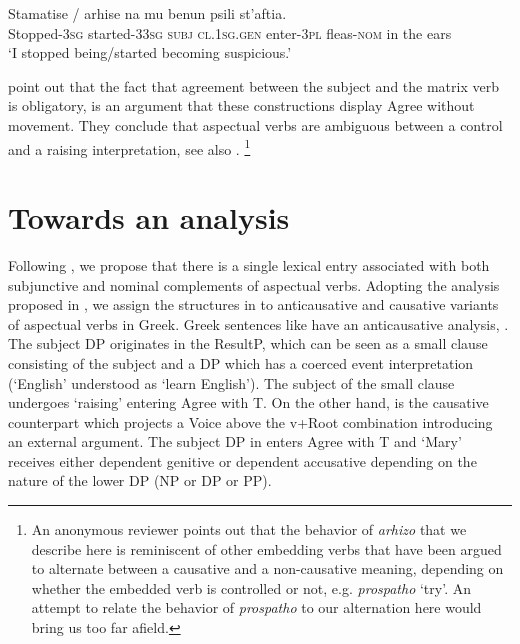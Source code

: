 \documentclass[output=paper]{langscibook}
\begin{document}
\ea%
    \label{alexiadouex:key:16}
    \gll *Stamatise / arhise    na     mu     benun psili    st'aftia.\\
    Stopped-\textsc{3sg} {} started-3\textsc{3sg}  \textsc{subj}    \textsc{cl.1sg.gen}   enter-\textsc{3pl} fleas-\textsc{nom}  {in the ears}   \\
    \glt ‘I stopped being/started becoming suspicious.’
\z

\citet{alexiadouanagnostopoulou1999} point out that the fact that agreement between the subject and the matrix verb is obligatory, 
is an argument that these constructions display Agree without movement. 
They conclude that aspectual verbs are ambiguous between a control and a raising interpretation, see also \citet{Roussou2009}.%
\footnote{
    An anonymous reviewer points out that the behavior of \textit{arhizo} that we describe here 
    is reminiscent of other embedding verbs that have been argued to alternate between a causative and a non-causative meaning, 
    depending on whether the embedded verb is controlled or not, e.g. \textit{prospatho} ‘try’. 
    An attempt to relate the behavior of \textit{prospatho} to our alternation here would bring us too far afield.
}

\section{Towards an analysis}

Following \citet{MourounasWilliamson2019}, we propose that there is a single lexical entry associated with both subjunctive and nominal complements of aspectual verbs. 
Adopting the analysis proposed in \citet{AlexiadouAnagnostopoulouSchafer2015}, 
we assign the structures in  to anticausative and causative variants of aspectual verbs in Greek. 
Greek sentences like  have an anticausative analysis, . 
The subject DP originates in the ResultP, which can be seen as a small clause consisting of the subject and a DP which has a coerced event interpretation 
(‘English’ understood as ‘learn English’). 
The subject of the small clause undergoes ‘raising’ entering Agree with T. 
On the other hand,  is the causative counterpart which projects a Voice above the v+Root combination introducing an external argument. 
The subject DP in  enters Agree with T and ‘Mary’ receives either dependent genitive or dependent accusative 
depending on the nature of the lower DP (NP or DP or PP). 
\end{document}
